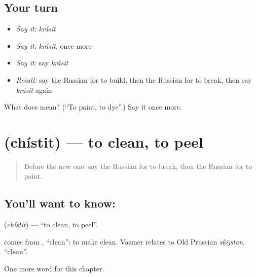 \subsection*{Your turn}
\begin{itemize}
\raggedright
  \item \emph{Say it:} \emph{krásit}
  \item \emph{Say it:} \emph{krásit}, once more
  \item \emph{Say it:} say \emph{krásit}
  \item \emph{Recall:} say the Russian for to build, then the Russian for to break, then say \emph{krásit} again
\end{itemize}

\begin{tcolorbox}[breakable,colback=teal!4,colframe=teal!35!black,title={Before you move on}]
What does  mean? (\textquotedblleft{}To paint, to dye\textquotedblright{}.) Say it once more.
\end{tcolorbox}
\section[\texorpdfstring{\ru{чистить} (chístit)}{чистить (chístit)}]{ (chístit) — to clean, to peel}

\label{lesson:RU-C206-chistit}



\begin{quote}
Before the new one: say the Russian for to break, then the Russian for to paint.
\end{quote}

\subsection*{You'll want to know: }
\textbf{} (\emph{chístit}) — \textquotedblleft{}to clean, to peel\textquotedblright{}.

\begin{cousinweb}
\textbf{} comes from \emph{}, \textquotedblleft{}clean\textquotedblright{}: to make clean. Vasmer relates \emph{} to Old Prussian \emph{skijstan}, \textquotedblleft{}clean\textquotedblright{}.
\end{cousinweb}

\begin{grammarlens}[title={What you've built}]
One more word for this chapter.
\end{grammarlens}

